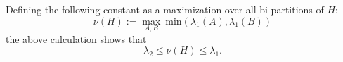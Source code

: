 \documentclass[11pt,oneside]{article}
\def\Ham{H}
\begin{document}
Defining the following constant as a maximization over
all bi-partitions of $\Ham:$
$$
    \nu(\Ham) := \max_{A, B}\ \mbox{min}(\lambda_1(A), \lambda_1(B))
$$
the above calculation shows that
$$
    \lambda_2 \le \nu(\Ham) \le \lambda_1.
$$



%
%
%
%



%


{}

\end{document}
